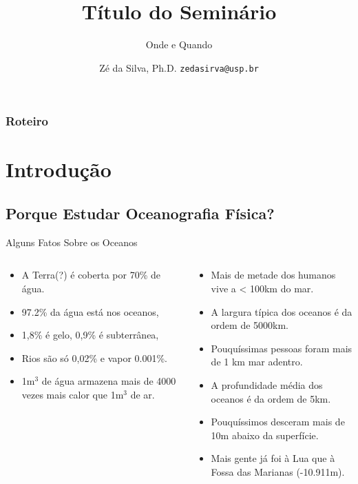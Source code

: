 \documentclass{beamer}
\title{Título do Seminário}
\subtitle{Onde e Quando}
\author[José da Silva]{Zé da Silva, Ph.D.  \hfill
  \texttt{zedasirva@usp.br}}
\institute[IOUSP]{Instituto Oceanográfico da USP\\
\texttt{[image: logolos\_310.png]}}
\date{}
\begin{document}
\begin{frame}
\vspace{1.5cm}
  \titlepage
\end{frame}
\usebackgroundtemplate{}
\begin{frame}
  \frametitle{Roteiro}
  \tableofcontents
\end{frame}
\section{Introdução}
\subsection{Porque Estudar Oceanografia Física?}
\begin{frame}{Alguns Fatos Sobre os Oceanos}
  \begin{columns}
    \begin{column}{5.5cm}   
      \begin{itemize}\setlength{\itemsep}{2ex}
      \item A Terra(?) é coberta por 70\% de água.
      \item 97.2\% da água está nos oceanos, 
      \item 1,8\% é gelo, 0,9\% é subterrânea, 
      \item \alert{Rios são só 0,02\%} e vapor 0.001\%.
      \item 1m$^3$ de água armazena mais de 4000 vezes mais calor que
        1m$^3$ de ar.
      \end{itemize}
    \end{column}
    \begin{column}{6.5cm}
\begin{itemize}\setlength{\itemsep}{1ex}
    \item Mais de metade dos humanos vive a < 100km do mar.
    \item A largura típica dos oceanos é da ordem de 5000km.
    \item Pouquíssimas pessoas foram mais de 1 km mar adentro.
    \item A profundidade média dos oceanos é da ordem de 5km.
    \item Pouquíssimos desceram mais de 10m abaixo da superfície.
    \item Mais gente já foi à Lua que à Fossa das Marianas (-10.911m).
    \end{itemize}
    \end{column}
  \end{columns}
\end{frame}
\end{document}
